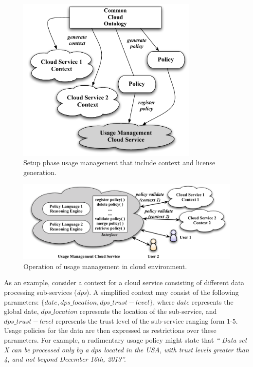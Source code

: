 \documentclass[10pt,letterpaper]{book}
\begin{document}
\begin{figure}[t]
\centering
\includegraphics[width=9cm]{cloud-setup}
\caption{Setup phase usage management that include context and license generation.}
\label{fig:cloud-setup}
\end{figure}

\begin{figure}[!t]
\centering
\includegraphics[width=13cm]{cloud-working}
\caption{Operation of usage management in cloud environment.}
\label{fig:cloud-working}
\end{figure}

As an example, consider a context for a cloud service consisting of  different data processing sub-services ({\em dps}). A simplified context may consist of the following parameters: $\{date, dps\_location, dps\_trust-level \}$, where $date$ represents the global date, $dps\_location$ represents the location of the sub-service, and $dps\_trust-level$ represents the trust level of the sub-service ranging form 1-5. Usage policies for the data are then expressed as restrictions over these parameters. For example, a rudimentary usage policy might state that {\em `` Data set X can be processed only by a $dps$ located in the USA, with trust levels greater than 4, and not beyond December 16th, 2013''. }
\end{document}
